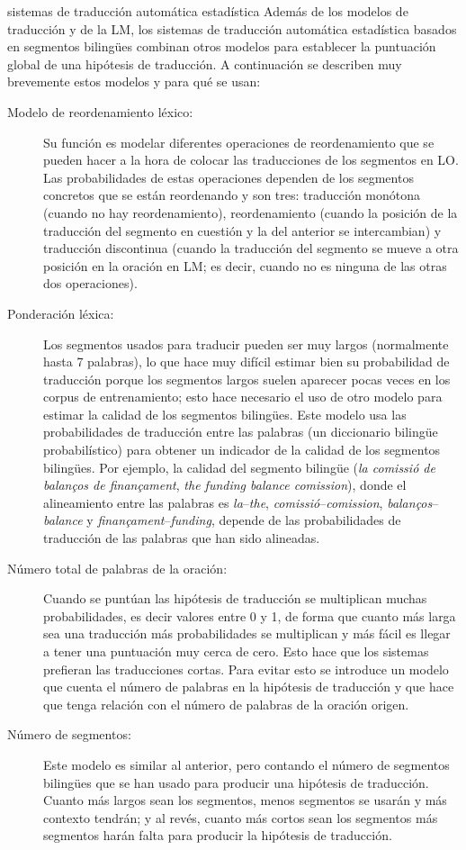 \begin{persabermes}{sistemas de traducción automática estadística} Además de los modelos de traducción y de la LM, los sistemas de traducción automática estadística basados en segmentos bilingües combinan otros modelos para establecer la puntuación global de una hipótesis de traducción. A continuación se describen muy brevemente estos modelos y para qué se usan: \begin{description} \item[Modelo de reordenamiento léxico:] Su función es modelar diferentes operaciones de reordenamiento que se pueden hacer a la hora de colocar las traducciones de los segmentos en LO. Las probabilidades de estas operaciones dependen de los segmentos concretos que se están reordenando y son tres: traducción monótona (cuando no hay reordenamiento), reordenamiento (cuando la posición de la traducción del segmento en cuestión y la del anterior se intercambian) y traducción discontinua (cuando la traducción del segmento se mueve a otra posición en la oración en LM; es decir, cuando no es ninguna de las otras dos operaciones). \item[Ponderación léxica:] Los segmentos usados para traducir pueden ser muy largos (normalmente hasta 7 palabras), lo que hace muy difícil estimar bien su probabilidad de traducción porque los segmentos largos suelen aparecer pocas veces en los corpus de entrenamiento; esto hace necesario el uso de otro modelo para estimar la calidad de los segmentos bilingües. Este modelo usa las probabilidades de traducción entre las palabras (un diccionario bilingüe probabilístico) para obtener un indicador de la calidad de los segmentos bilingües. Por ejemplo, la calidad del segmento bilingüe (\emph{la comissió de balanços de finançament}, \emph{the funding balance comission}), donde el alineamiento entre las palabras es \emph{la}--\emph{the}, \emph{comissió}--\emph{comission}, \emph{balanços}--\emph{balance} y \emph{finançament}--\emph{funding}, depende de las probabilidades de traducción de las palabras que han sido alineadas. \item[Número total de palabras de la oración:] Cuando se puntúan las hipótesis de traducción se multiplican muchas probabilidades, es decir valores entre 0 y 1, de forma que cuanto más larga sea una traducción más probabilidades se multiplican y más fácil es llegar a tener una puntuación muy cerca de cero. Esto hace que los sistemas prefieran las traducciones cortas. Para evitar esto se introduce un modelo que cuenta el número de palabras en la hipótesis de traducción y que hace que tenga relación con el número de palabras de la oración origen. \item[Número de segmentos:] Este modelo es similar al anterior, pero contando el número de segmentos bilingües que se han usado para producir una hipótesis de traducción. Cuanto más largos sean los segmentos, menos segmentos se usarán y más contexto tendrán; y al revés, cuanto más cortos sean los segmentos más segmentos harán falta para producir la hipótesis de traducción. \end{description} 


\end{persabermes}
